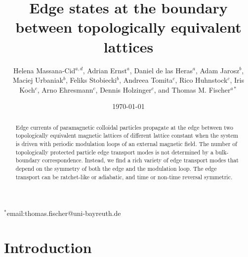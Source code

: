 \documentclass[12pt]{iopart}
\begin{document}
	


\title{Edge states at the boundary between topologically equivalent lattices}
\author{Helena Massana-Cid$^{a,d}$, Adrian Ernst$^{a}$,  Daniel de las Heras$^{a}$, 
	Adam Jarosz$^b$, Maciej Urbaniak$^b$, Feliks Stobiecki$^b$, 
	Andreea Tomita$^c$, Rico Huhnstock$^c$, Iris Koch$^c$, Arno Ehresmann$^c$, Dennis Holzinger$^c$, and Thomas M. Fischer$^{a*}$}
\address{$^{a}$ Institute of Physics and Mathematics, Universit\"at Bayreuth, D-95440 Bayreuth (Germany).
	$^b$ Institute of Molecular Physics, Polish Academy of Sciences, 
	ul. M. Smoluchowskiego 17, 60-179 Pozna\'n (Poland).
	$^c$ Institute of Physics and Centre for Interdisciplinary Nanostructure Science and Technology (CINSaT), Universit\"at Kassel, Heinrich-Plett-Strasse 40, D-34132 Kassel (Germany)
	$^d$ 
	Departament de F\'isica de la Mat\`eria Condensada, Universitat de Barcelona, Avinguda Diagonal 647, 08028 Barcelona, (Spain)}

$^*$email:thomas.fischer@uni-bayreuth.de


	\vspace{10pt}
\begin{indented}
	\item[]\date{\today}
\end{indented}

\begin{abstract}{
Edge currents of paramagnetic colloidal particles propagate at the edge between two topologically
equivalent magnetic lattices of different lattice constant when the system is driven with periodic
modulation loops of an external magnetic field. The number of topologically protected particle edge transport
modes is not determined by a bulk-boundary correspondence. Instead, we find a rich variety of edge transport modes
that depend on the symmetry of both the edge and  the modulation loop. The edge transport can be ratchet-like or adiabatic, and time
or non-time reversal symmetric.
}\end{abstract}

\maketitle
\section{Introduction}
\end{document}
